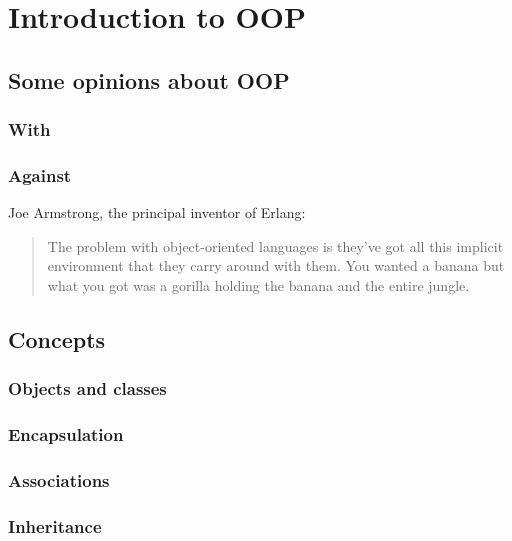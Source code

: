 \documentclass[12pt]{book}
\begin{document}
	\chapter{Introduction to OOP}
\fi


\section{Some opinions about OOP}

\subsection{With}

\subsection{Against}

Joe Armstrong, the principal inventor of Erlang:
\begin{quote}
The problem with object-oriented languages is they've got all this implicit environment that they carry around with them. 
You wanted a banana but what you got was a gorilla holding the banana and the entire jungle.
\end{quote}



\section{Concepts}

\subsection{Objects and classes}

\subsection{Encapsulation}

\subsection{Associations}

\subsection{Inheritance}
\end{document}
